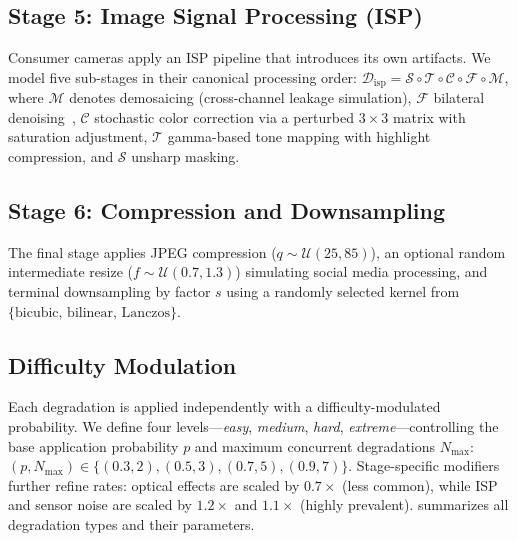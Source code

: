 \subsection{Stage 5: Image Signal Processing (ISP)}
\label{sec:pipeline_isp}

Consumer cameras apply an ISP pipeline that introduces its own artifacts.
We model five sub-stages in their canonical processing order: $\mathcal{D}_{\text{isp}} = \mathcal{S} \circ \mathcal{T} \circ \mathcal{C} \circ \mathcal{F} \circ \mathcal{M}$, where $\mathcal{M}$ denotes demosaicing (cross-channel leakage simulation), $\mathcal{F}$ bilateral denoising~\cite{tomasi1998bilateral}, $\mathcal{C}$ stochastic color correction via a perturbed $3{\times}3$ matrix with saturation adjustment, $\mathcal{T}$ gamma-based tone mapping with highlight compression, and $\mathcal{S}$ unsharp masking.

\subsection{Stage 6: Compression and Downsampling}
\label{sec:pipeline_compression}

The final stage applies JPEG compression ($q \sim \mathcal{U}(25, 85)$), an optional random intermediate resize ($f \sim \mathcal{U}(0.7, 1.3)$) simulating social media processing, and terminal downsampling by factor $s$ using a randomly selected kernel from $\{\text{bicubic, bilinear, Lanczos}\}$.

\subsection{Difficulty Modulation}
\label{sec:pipeline_difficulty}

Each degradation is applied independently with a difficulty-modulated probability.
We define four levels---\textit{easy}, \textit{medium}, \textit{hard}, \textit{extreme}---controlling the base application probability $p$ and maximum concurrent degradations $N_{\max}$:
$(p, N_{\max}) \in \{(0.3, 2), (0.5, 3), (0.7, 5), (0.9, 7)\}$.
Stage-specific modifiers further refine rates: optical effects are scaled by $0.7{\times}$ (less common), while ISP and sensor noise are scaled by $1.2{\times}$ and $1.1{\times}$ (highly prevalent).
 summarizes all degradation types and their parameters.

